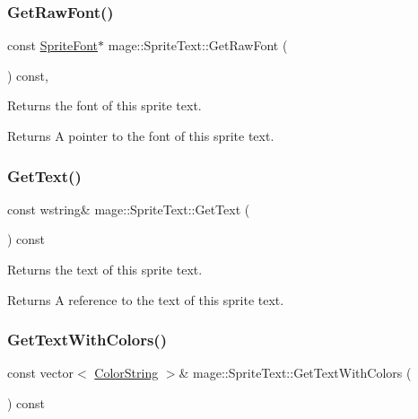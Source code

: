 \subsubsection{\texorpdfstring{Get\+Raw\+Font()}{GetRawFont()}}
{\footnotesize\ttfamily const \hyperlink{classmage_1_1_sprite_font}{Sprite\+Font}$\ast$ mage\+::\+Sprite\+Text\+::\+Get\+Raw\+Font (\begin{DoxyParamCaption}{ }\end{DoxyParamCaption}) const\hspace{0.3cm}{\ttfamily [protected]}, {\ttfamily [noexcept]}}

Returns the font of this sprite text.

\begin{DoxyReturn}{Returns}
A pointer to the font of this sprite text. 
\end{DoxyReturn}
\hypertarget{classmage_1_1_sprite_text_adf93f6290fb55685aee478255e88792e}{}\label{classmage_1_1_sprite_text_adf93f6290fb55685aee478255e88792e} 
\subsubsection{\texorpdfstring{Get\+Text()}{GetText()}}
{\footnotesize\ttfamily const wstring\& mage\+::\+Sprite\+Text\+::\+Get\+Text (\begin{DoxyParamCaption}{ }\end{DoxyParamCaption}) const\hspace{0.3cm}{\ttfamily [noexcept]}}

Returns the text of this sprite text.

\begin{DoxyReturn}{Returns}
A reference to the text of this sprite text. 
\end{DoxyReturn}
\hypertarget{classmage_1_1_sprite_text_a2493ad5e9a8c472dae8beb92f51dc882}{}\label{classmage_1_1_sprite_text_a2493ad5e9a8c472dae8beb92f51dc882} 
\subsubsection{\texorpdfstring{Get\+Text\+With\+Colors()}{GetTextWithColors()}}
{\footnotesize\ttfamily const vector$<$ \hyperlink{structmage_1_1_color_string}{Color\+String} $>$\& mage\+::\+Sprite\+Text\+::\+Get\+Text\+With\+Colors (\begin{DoxyParamCaption}{ }\end{DoxyParamCaption}) const\hspace{0.3cm}{\ttfamily [noexcept]}}

